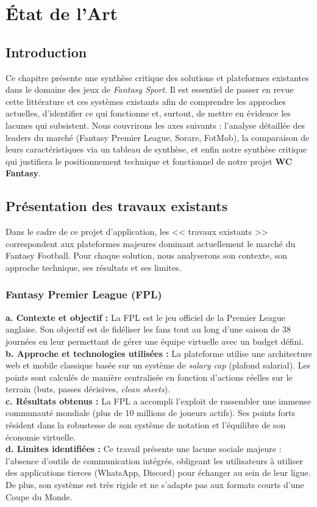 
\chapter{État de l'Art}

\section{Introduction}
Ce chapitre présente une synthèse critique des solutions et plateformes existantes dans le domaine des jeux de \textit{Fantasy Sport}. Il est essentiel de passer en revue cette littérature et ces systèmes existants afin de comprendre les approches actuelles, d'identifier ce qui fonctionne et, surtout, de mettre en évidence les lacunes qui subsistent. Nous couvrirons les axes suivants : l'analyse détaillée des leaders du marché (Fantasy Premier League, Sorare, FotMob), la comparaison de leurs caractéristiques via un tableau de synthèse, et enfin notre synthèse critique qui justifiera le positionnement technique et fonctionnel de notre projet \textbf{WC Fantasy}.

\section{Présentation des travaux existants}
Dans le cadre de ce projet d'application, les << travaux existants >> correspondent aux plateformes majeures dominant actuellement le marché du Fantasy Football. Pour chaque solution, nous analyserons son contexte, son approche technique, ses résultats et ses limites.

\subsection{Fantasy Premier League (FPL)}
\textbf{a. Contexte et objectif :} La FPL est le jeu officiel de la Premier League anglaise. Son objectif est de fidéliser les fans tout au long d'une saison de 38 journées en leur permettant de gérer une équipe virtuelle avec un budget défini.\\
\textbf{b. Approche et technologies utilisées :} La plateforme utilise une architecture web et mobile classique basée sur un système de \textit{salary cap} (plafond salarial). Les points sont calculés de manière centralisée en fonction d'actions réelles sur le terrain (buts, passes décisives, \textit{clean sheets}).\\
\textbf{c. Résultats obtenus :} La FPL a accompli l'exploit de rassembler une immense communauté mondiale (plus de 10 millions de joueurs actifs). Ses points forts résident dans la robustesse de son système de notation et l'équilibre de son économie virtuelle.\\
\textbf{d. Limites identifiées :} Ce travail présente une lacune sociale majeure : l'absence d'outils de communication intégrés, obligeant les utilisateurs à utiliser des applications tierces (WhatsApp, Discord) pour échanger au sein de leur ligue. De plus, son système est très rigide et ne s'adapte pas aux formats courts d'une Coupe du Monde.

